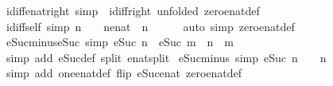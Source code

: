 \begin{isabellebody}
%
\isadelimproof
\isanewline
%
\endisadelimproof
\isanewline
{}\isamarkupfalse%
\ idiff{\isacharunderscore}enat{\isacharunderscore}{}{\isacharunderscore}right\ {\isacharbrackleft}simp{\isacharbrackright}\ {\isacharequal}\ idiff{\isacharunderscore}{}{\isacharunderscore}right\ {\isacharbrackleft}unfolded\ zero{\isacharunderscore}enat{\isacharunderscore}def{\isacharbrackright}\isanewline
\isanewline
{}\isamarkupfalse%
\ idiff{\isacharunderscore}self\ {\isacharbrackleft}simp{\isacharbrackright}{\isacharcolon}\ {\isachardoublequoteopen}n\ {\isasymnoteq}\ {\isasyminfinity}\ {\isasymLongrightarrow}\ {\isacharparenleft}n{\isacharcolon}{\isacharcolon}enat{\isacharparenright}\ {\isacharminus}\ n\ {\isacharequal}\ {}{\isachardoublequoteclose}\isanewline
%
\isadelimproof
\ \ %
\endisadelimproof
%
\isatagproof
{}\isamarkupfalse%
\ {\isacharparenleft}auto\ simp{\isacharcolon}\ zero{\isacharunderscore}enat{\isacharunderscore}def{\isacharparenright}%
\endisatagproof
{\isafoldproof}%
%
\isadelimproof
\isanewline
%
\endisadelimproof
\isanewline
{}\isamarkupfalse%
\ eSuc{\isacharunderscore}minus{\isacharunderscore}eSuc\ {\isacharbrackleft}simp{\isacharbrackright}{\isacharcolon}\ {\isachardoublequoteopen}eSuc\ n\ {\isacharminus}\ eSuc\ m\ {\isacharequal}\ n\ {\isacharminus}\ m{\isachardoublequoteclose}\isanewline
%
\isadelimproof
\ \ %
\endisadelimproof
%
\isatagproof
{}\isamarkupfalse%
\ {\isacharparenleft}simp\ add{\isacharcolon}\ eSuc{\isacharunderscore}def\ split{\isacharcolon}\ enat{\isachardot}split{\isacharparenright}%
\endisatagproof
{\isafoldproof}%
%
\isadelimproof
\isanewline
%
\endisadelimproof
\isanewline
{}\isamarkupfalse%
\ eSuc{\isacharunderscore}minus{\isacharunderscore}{}\ {\isacharbrackleft}simp{\isacharbrackright}{\isacharcolon}\ {\isachardoublequoteopen}eSuc\ n\ {\isacharminus}\ {}\ {\isacharequal}\ n{\isachardoublequoteclose}\isanewline
%
\isadelimproof
\ \ %
\endisadelimproof
%
\isatagproof
{}\isamarkupfalse%
\ {\isacharparenleft}simp\ add{\isacharcolon}\ one{\isacharunderscore}enat{\isacharunderscore}def\ flip{\isacharcolon}\ eSuc{\isacharunderscore}enat\ zero{\isacharunderscore}enat{\isacharunderscore}def{\isacharparenright}%
\endisatagproof
{\isafoldproof}%
%
\isadelimproof
%
\endisadelimproof
%
\isadelimdocument
%
\endisadelimdocument
%
\isatagdocument
%
\isamarkuptrue%
%
\endisatagdocument
{\isafolddocument}%
%
\isadelimdocument
%
\endisadelimdocument
{}\isamarkupfalse%

\end{isabellebody}
